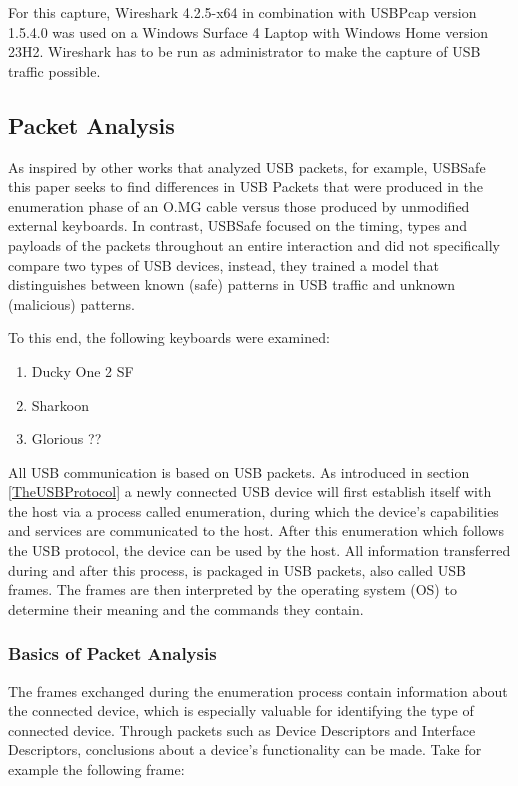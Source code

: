 For this capture, Wireshark 4.2.5-x64 in combination with USBPcap version 1.5.4.0 was used on a Windows Surface 4 Laptop with Windows Home version 23H2. Wireshark has to be run as administrator to make the capture of USB traffic possible.


\subsection{Packet Analysis}\label{Packet Analysis}


As inspired by other works that analyzed USB packets, for example, USBSafe \cite{kharrazUSBESAFEEndPointSolution2019} this paper seeks to find differences in USB Packets that were produced in the enumeration phase of an O.MG cable versus those produced by unmodified external keyboards. In contrast, USBSafe focused on the timing, types and payloads of the packets throughout an entire interaction and did not specifically compare two types of USB devices, instead, they trained a model that distinguishes between known (safe) patterns in USB traffic and unknown (malicious) patterns. 

To this end, the following keyboards were examined:
\begin{enumerate}
    \item Ducky One 2 SF
    \item Sharkoon
    \item Glorious ??
\end{enumerate}


All USB communication is based on USB packets. As introduced in section \ref{TheUSBProtocol} a newly connected USB device will first establish itself with the host via a process called enumeration, during which the device's capabilities and services are communicated to the host. After this enumeration which follows the USB protocol, the device can be used by the host.
All information transferred during and after this process, is packaged in USB packets, also called USB frames. The frames are then interpreted by the operating system (OS) to determine their meaning and the commands they contain.



\subsubsection{Basics of Packet Analysis}

The frames exchanged during the enumeration process contain information about the connected device, which is especially valuable for identifying the type of connected device.
Through packets such as Device Descriptors and Interface Descriptors, conclusions about a device's functionality can be made. Take for example the following frame:

